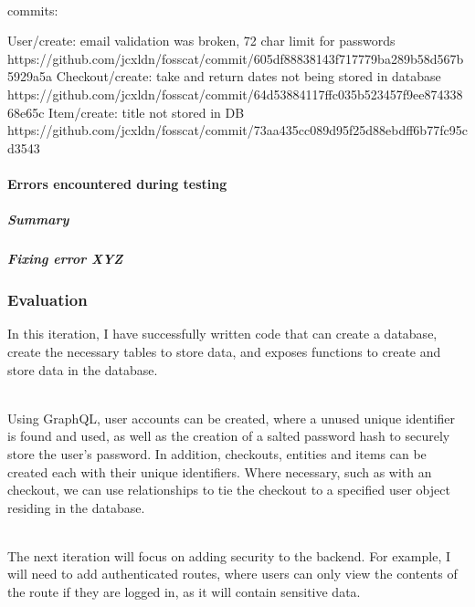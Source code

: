 \documentclass[../../main.tex]{subfiles}
\begin{document}
\noindent \\ commits:
\begin{outline}
    \1 User/create: email validation was broken, 72 char limit for passwords
    \2 https://github.com/jcxldn/fosscat/commit/605df88838143f717779ba289b58d567b5929a5a
    \1 Checkout/create: take and return dates not being stored in database
    \2 https://github.com/jcxldn/fosscat/commit/64d53884117ffc035b523457f9ee87433868e65c
    \1 Item/create: title not stored in DB
    \2 https://github.com/jcxldn/fosscat/commit/73aa435cc089d95f25d88ebdff6b77fc95cd3543
\end{outline}

\paragraph{Errors encountered during testing}

\subparagraph{Summary}

\subparagraph{Fixing error XYZ}

\subsubsection{Evaluation}

\noindent In this iteration, I have successfully written code that can create a database, create the necessary tables to store data, and exposes functions to create and store data in the database.

\noindent \\ Using GraphQL, user accounts can be created, where a unused unique identifier is found and used, as well as the creation of a salted password hash to securely store the user's password. In addition, checkouts, entities and items can be created each with their unique identifiers. Where necessary, such as with an checkout, we can use relationships to tie the checkout to a specified user object residing in the database.

\noindent \\ The next iteration will focus on adding security to the backend. For example, I will need to add authenticated routes, where users can only view the contents of the route if they are logged in, as it will contain sensitive data.
\end{document}
